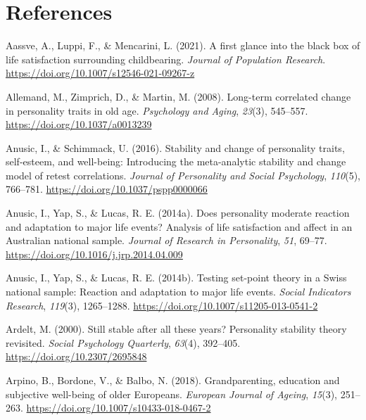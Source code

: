 \documentclass[
  english,
  man, noextraspace]{apa7}
\begin{document}
\newpage

\hypertarget{references}{%
\section{References}\label{references}}

\begingroup
\setlength{\parindent}{-0.5in}
\setlength{\leftskip}{0.5in}

\hypertarget{refs}{}
\leavevmode\hypertarget{ref-aassveFirstGlanceBlack2021}{}%
Aassve, A., Luppi, F., \& Mencarini, L. (2021). A first glance into the black box of life satisfaction surrounding childbearing. \emph{Journal of Population Research}. \url{https://doi.org/10.1007/s12546-021-09267-z}

\leavevmode\hypertarget{ref-allemandLongtermCorrelatedChange2008a}{}%
Allemand, M., Zimprich, D., \& Martin, M. (2008). Long-term correlated change in personality traits in old age. \emph{Psychology and Aging}, \emph{23}(3), 545--557. \url{https://doi.org/10.1037/a0013239}

\leavevmode\hypertarget{ref-anusicStabilityChangePersonality2016}{}%
Anusic, I., \& Schimmack, U. (2016). Stability and change of personality traits, self-esteem, and well-being: Introducing the meta-analytic stability and change model of retest correlations. \emph{Journal of Personality and Social Psychology}, \emph{110}(5), 766--781. \url{https://doi.org/10.1037/pspp0000066}

\leavevmode\hypertarget{ref-anusicDoesPersonalityModerate2014}{}%
Anusic, I., Yap, S., \& Lucas, R. E. (2014a). Does personality moderate reaction and adaptation to major life events? Analysis of life satisfaction and affect in an Australian national sample. \emph{Journal of Research in Personality}, \emph{51}, 69--77. \url{https://doi.org/10.1016/j.jrp.2014.04.009}

\leavevmode\hypertarget{ref-anusicTestingSetpointTheory2014}{}%
Anusic, I., Yap, S., \& Lucas, R. E. (2014b). Testing set-point theory in a Swiss national sample: Reaction and adaptation to major life events. \emph{Social Indicators Research}, \emph{119}(3), 1265--1288. \url{https://doi.org/10.1007/s11205-013-0541-2}

\leavevmode\hypertarget{ref-ardeltStillStableAll2000}{}%
Ardelt, M. (2000). Still stable after all these years? Personality stability theory revisited. \emph{Social Psychology Quarterly}, \emph{63}(4), 392--405. \url{https://doi.org/10.2307/2695848}

\leavevmode\hypertarget{ref-arpinoGrandparentingEducationSubjective2018}{}%
Arpino, B., Bordone, V., \& Balbo, N. (2018). Grandparenting, education and subjective well-being of older Europeans. \emph{European Journal of Ageing}, \emph{15}(3), 251--263. \url{https://doi.org/10.1007/s10433-018-0467-2}
\end{document}
